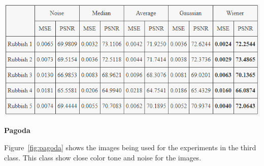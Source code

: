 \begin{center}
\includegraphics[width=15cm]{images/Rubish.png}
\end{center}

\newpage

\textbf{Pagoda}

Figure~\ref{fig:pagoda} shows the images being used for the experiments in the third class. This class show close color tone and noise for the images.


